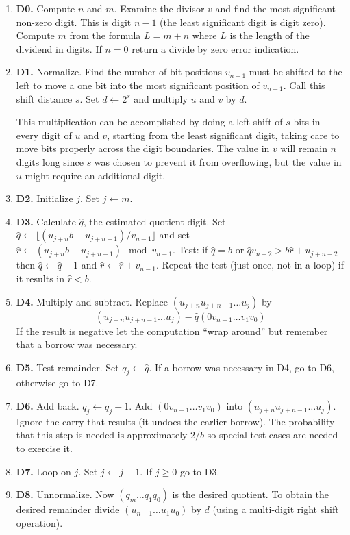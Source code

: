\documentclass{article}
\begin{document}
\begin{enumerate}

\item \textbf{D0.} Compute $n$ and $m$. Examine the divisor $v$ and find the most significant
  non-zero digit. This is digit $n - 1$ (the least significant digit is digit zero). Compute $m$
  from the formula $L = m + n$ where $L$ is the length of the dividend in digits. If $n = 0$
  return a divide by zero error indication.

\item \textbf{D1.} Normalize. Find the number of bit positions $v_{n-1}$ must be shifted to the
  left to move a one bit into the most significant position of $v_{n-1}$. Call this shift
  distance $s$. Set $d \leftarrow 2^s$ and multiply $u$ and $v$ by $d$.

  This multiplication can be accomplished by doing a left shift of $s$ bits in every digit of
  $u$ and $v$, starting from the least significant digit, taking care to move bits properly
  across the digit boundaries. The value in $v$ will remain $n$ digits long since $s$ was chosen
  to prevent it from overflowing, but the value in $u$ might require an additional digit.

\item \textbf{D2.} Initialize $j$. Set $j \leftarrow m$.

\item \textbf{D3.} Calculate $\hat{q}$, the estimated quotient digit. Set $\hat{q} \leftarrow
  \lfloor(u_{j+n}b + u_{j+n-1})/v_{n-1}\rfloor$ and set $\hat{r} \leftarrow (u_{j+n}b +
  u_{j+n-1}) \mod v_{n-1}$. Test: if $\hat{q} = b$ or $\hat{q}v_{n-2} > b\hat{r} + u_{j+n-2}$
  then $\hat{q} \leftarrow \hat{q} - 1$ and $\hat{r} \leftarrow \hat{r} + v_{n-1}$. Repeat the
  test (just once, not in a loop) if it results in $\hat{r} < b$.

\item \textbf{D4.} Multiply and subtract. Replace $(u_{j+n}u_{j+n-1}\ldots u_j)$ by
$$
(u_{j+n}u_{j+n-1}\ldots u_j) - \hat{q}(0v_{n-1}\ldots v_1 v_0)
$$
If the result is negative let the computation ``wrap around'' but remember that a borrow was
necessary.

\item \textbf{D5.} Test remainder. Set $q_j \leftarrow \hat{q}$. If a borrow was necessary in
  D4, go to D6, otherwise go to D7.

\item \textbf{D6.} Add back. $q_j \leftarrow q_j - 1$. Add $(0v_{n-1}\ldots v_1 v_0)$ into
  $(u_{j+n}u_{j+n-1}\ldots u_j)$. Ignore the carry that results (it undoes the earlier borrow).
  The probability that this step is needed is approximately $2/b$ so special test cases are
  needed to exercise it.

\item \textbf{D7.} Loop on $j$. Set $j \leftarrow j - 1$. If $j \ge 0$ go to D3.

\item \textbf{D8.} Unnormalize. Now $(q_m\ldots q_1 q_0)$ is the desired quotient. To obtain the
  desired remainder divide $(u_{n-1}\ldots u_1 u_0)$ by $d$ (using a multi-digit right shift
  operation).

\end{enumerate}
\end{document}
